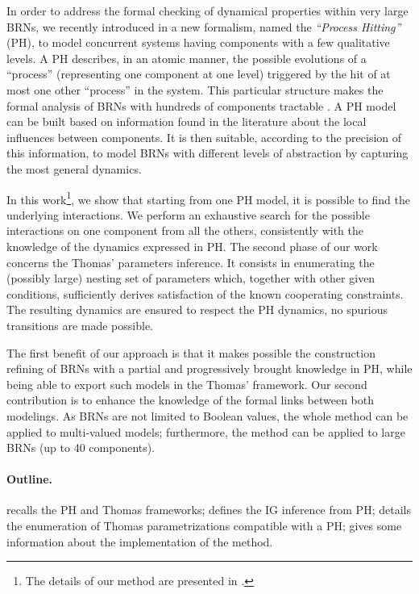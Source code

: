 In order to address the formal checking of dynamical properties within very large BRNs, we recently
introduced in \cite{PMR10-TCSB} a new formalism, named the \emph{``Process Hitting''} (PH), to model
concurrent systems having components with a few qualitative levels.
A PH describes, in an atomic manner, the possible evolutions of a “process” (representing one
component at one level) triggered by the hit of at most one other “process” in the system.
This particular structure makes the formal analysis of BRNs with hundreds of components tractable \cite{PMR12-MSCS}.
A PH model can be built based on information found in the literature about the local influences between components.
It is then suitable, according to the precision of this information, to model BRNs with different levels of abstraction by capturing the most general dynamics.

In this work\footnote{The details of our method are presented in \cite{FPIMR12-CMSB}.}, we show that starting from one PH model, it is possible to find the underlying interactions.
We perform an exhaustive search for the possible interactions on one component from all the
others, consistently with the knowledge of the dynamics expressed in PH.
The second phase of our work concerns the Thomas' parameters inference.
It consists in enumerating the (possibly large) nesting set of parameters which, together with other given conditions, sufficiently derives satisfaction of the known cooperating constraints.
The resulting dynamics are ensured to respect the PH dynamics, \ie no spurious transitions are
made possible.

The first benefit of our approach is that it makes possible the construction refining of BRNs with a partial and progressively brought knowledge in PH, while being able to export such models in the Thomas' framework.
Our second contribution is to enhance the knowledge of the formal links between both modelings.
As BRNs are not limited to Boolean values, the whole method can be applied to multi-valued models;
furthermore, the method can be applied to large BRNs (up to 40 components).

\paragraph{Outline.}
 recalls the PH and Thomas frameworks;
 defines the IG inference from PH;
 details the enumeration of Thomas parametrizations compatible with a PH;
 gives some information about the implementation of the method.
